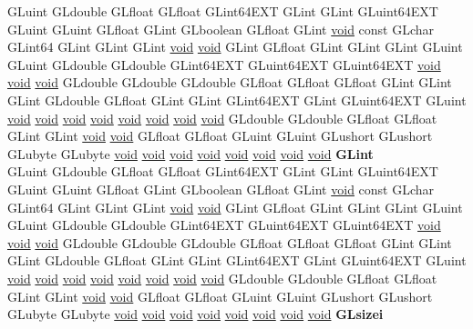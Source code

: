 \begin{DoxyCompactItemize}
\begin{tabbing}
\>GLuint GLdouble GLfloat GLfloat GLint64EXT GLint GLint GLuint64EXT GLuint GLuint GLfloat GLint GLboolean GLfloat GLint \hyperlink{interfacevoid}{void} const GLchar GLint64 GLint GLint GLint \hyperlink{interfacevoid}{void} \hyperlink{interfacevoid}{void} GLint GLfloat GLint GLint GLint GLuint GLuint GLdouble GLdouble GLint64EXT GLuint64EXT GLuint64EXT \hyperlink{interfacevoid}{void} \hyperlink{interfacevoid}{void} \hyperlink{interfacevoid}{void} GLdouble GLdouble GLdouble GLfloat GLfloat GLfloat GLint GLint GLint GLdouble GLfloat GLint GLint GLint64EXT GLint GLuint64EXT GLuint \hyperlink{interfacevoid}{void} \hyperlink{interfacevoid}{void} \hyperlink{interfacevoid}{void} \hyperlink{interfacevoid}{void} \hyperlink{interfacevoid}{void} \hyperlink{interfacevoid}{void} \hyperlink{interfacevoid}{void} \hyperlink{interfacevoid}{void} GLdouble GLdouble GLfloat GLfloat GLint GLint \hyperlink{interfacevoid}{void} \hyperlink{interfacevoid}{void} GLfloat GLfloat GLuint GLuint GLushort GLushort GLubyte GLubyte \hyperlink{interfacevoid}{void} \hyperlink{interfacevoid}{void} \hyperlink{interfacevoid}{void} \hyperlink{interfacevoid}{void} \hyperlink{interfacevoid}{void} \hyperlink{interfacevoid}{void} \hyperlink{interfacevoid}{void} \hyperlink{interfacevoid}{void} {\bfseries GLint}\\
\>GLuint GLdouble GLfloat GLfloat GLint64EXT GLint GLint GLuint64EXT GLuint GLuint GLfloat GLint GLboolean GLfloat GLint \hyperlink{interfacevoid}{void} const GLchar GLint64 GLint GLint GLint \hyperlink{interfacevoid}{void} \hyperlink{interfacevoid}{void} GLint GLfloat GLint GLint GLint GLuint GLuint GLdouble GLdouble GLint64EXT GLuint64EXT GLuint64EXT \hyperlink{interfacevoid}{void} \hyperlink{interfacevoid}{void} \hyperlink{interfacevoid}{void} GLdouble GLdouble GLdouble GLfloat GLfloat GLfloat GLint GLint GLint GLdouble GLfloat GLint GLint GLint64EXT GLint GLuint64EXT GLuint \hyperlink{interfacevoid}{void} \hyperlink{interfacevoid}{void} \hyperlink{interfacevoid}{void} \hyperlink{interfacevoid}{void} \hyperlink{interfacevoid}{void} \hyperlink{interfacevoid}{void} \hyperlink{interfacevoid}{void} \hyperlink{interfacevoid}{void} GLdouble GLdouble GLfloat GLfloat GLint GLint \hyperlink{interfacevoid}{void} \hyperlink{interfacevoid}{void} GLfloat GLfloat GLuint GLuint GLushort GLushort GLubyte GLubyte \hyperlink{interfacevoid}{void} \hyperlink{interfacevoid}{void} \hyperlink{interfacevoid}{void} \hyperlink{interfacevoid}{void} \hyperlink{interfacevoid}{void} \hyperlink{interfacevoid}{void} \hyperlink{interfacevoid}{void} \hyperlink{interfacevoid}{void} {\bfseries GLsizei}\\

\end{tabbing}
\end{DoxyCompactItemize}
